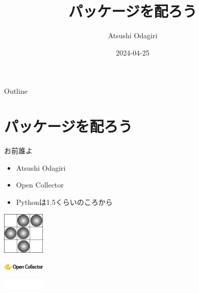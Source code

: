 \documentclass[presentation]{beamer}
\author{Atsushi Odagiri}
\date{2024-04-25}
\title{パッケージを配ろう}
\begin{document}
\maketitle
\begin{frame}{Outline}
\tableofcontents
\end{frame}

\section{パッケージを配ろう}
\label{sec:org7b10f3b}
\begin{frame}[label={sec:org29bed87}]{お前誰よ}
\begin{block}{}
\begin{itemize}
\item Atsushi Odagiri
\item Open Collector
\item Pythonは1.5くらいのころから
\end{itemize}
\end{block}

\begin{block}{}
\begin{center}
\includegraphics[width=2cm]{./r-penta512.png}
\end{center}

\begin{center}
\includegraphics[width=2cm]{./oc-logo.png}
\end{center}
\begin{center}
\includegraphics[width=2cm]{./logo-w.png}
\end{center}
\end{block}
\end{frame}
\end{document}
